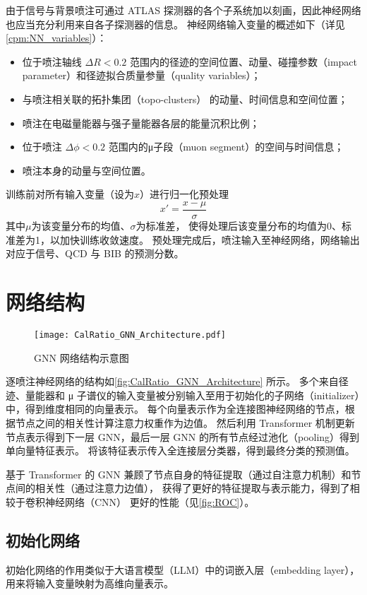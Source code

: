 由于信号与背景喷注可通过 ATLAS 探测器的各个子系统加以刻画，因此神经网络也应当充分利用来自各子探测器的信息。
神经网络输入变量的概述如下（详见\autoref{cpm:NN_variables}）：
\begin{itemize}
    \item 位于喷注轴线 $\Delta R < 0.2$ 范围内的径迹的空间位置、动量、碰撞参数（impact parameter）和径迹拟合质量参量（quality variables）；
    \item 与喷注相关联的拓扑集团（topo-clusters） 的动量、时间信息和空间位置；
    \item 喷注在电磁量能器与强子量能器各层的能量沉积比例；
    \item 位于喷注 $\Delta \phi < 0.2$ 范围内的μ子段（muon segment）的空间与时间信息；
    \item 喷注本身的动量与空间位置。
\end{itemize}

训练前对所有输入变量（设为$x$）进行归一化预处理
\begin{equation}
    x' = \frac{x-\mu}{\sigma}
\end{equation}
其中$\mu$为该变量分布的均值、$\sigma$为标准差，
使得处理后该变量分布的均值为0、标准差为1，以加快训练收敛速度。
预处理完成后，喷注输入至神经网络，网络输出对应于信号、QCD 与 BIB 的预测分数。


\section{网络结构}
\begin{figure}[ht]
    \centering
    \texttt{[image: CalRatio\_GNN\_Architecture.pdf]}
    \caption{GNN 网络结构示意图}
    \label{fig:CalRatio_GNN_Architecture}
\end{figure}

逐喷注神经网络的结构如\autoref{fig:CalRatio_GNN_Architecture} 所示。
多个来自径迹、量能器和 μ 子谱仪的输入变量被分别输入至用于初始化的子网络（initializer）中，得到维度相同的向量表示。
每个向量表示作为全连接图神经网络的节点，根据节点之间的相关性计算注意力权重作为边值。
然后利用 Transformer 机制更新节点表示得到下一层 GNN，最后一层 GNN 的所有节点经过池化（pooling）得到单向量特征表示。
将该特征表示传入全连接层分类器，得到最终分类的预测值。

基于 Transformer 的 GNN 兼顾了节点自身的特征提取（通过自注意力机制）和节点间的相关性（通过注意力边值），
获得了更好的特征提取与表示能力，得到了相较于卷积神经网络（CNN）\cite{ATLAS:2022zhj} 更好的性能（见\autoref{fig:ROC}）。


\subsection{初始化网络}
初始化网络的作用类似于大语言模型（LLM）中的词嵌入层（embedding layer），用来将输入变量映射为高维向量表示。

